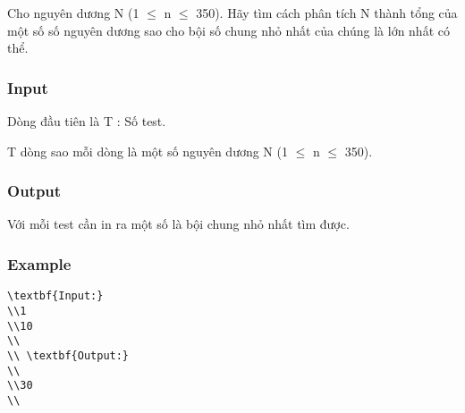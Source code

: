 



   Cho nguyên dương N (1 $\le$ n $\le$ 350). Hãy tìm cách phân tích N thành tổng của một số số nguyên dương sao cho bội số chung nhỏ nhất của chúng là lớn nhất có thể.  

\subsubsection{   Input  }

   Dòng đầu tiên là T : Số test.  

   T dòng sao mỗi dòng là một số nguyên dương N (1 $\le$ n  $\le$ 350).  

\subsubsection{   Output  }

   Với mỗi test cần in ra một số là bội chung nhỏ nhất tìm được.  



\subsubsection{   Example  }
\begin{verbatim}
\textbf{Input:}
\\1
\\10
\\
\\ \textbf{Output:}
\\
\\30
\\\end{verbatim}
